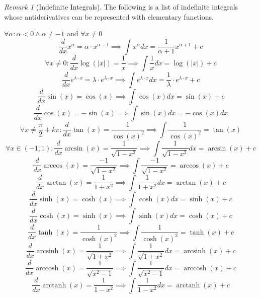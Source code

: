 \documentclass[english,titlepage]{uzhpub}
\DeclareMathOperator\arctanh{arctanh}
\DeclareMathOperator\arcsinh{arcsinh}
\DeclareMathOperator\arccosh{arccosh}
\theoremstyle{definition}
\theoremstyle{plain}
\theoremstyle{remark}
\newtheorem*{remark}{Remark}
\theoremstyle{example}
\begin{document}
   \begin{remark}[Indefinite Integrals]
      The following is a list of indefinite integrals whose antiderivatives can be represented with elementary functions.

      \(\forall \alpha: \alpha < 0 \land \alpha \neq -1\) and \(\forall x \neq 0\)
      \[\frac{d}{dx} x^\alpha = \alpha \cdot x^{\alpha - 1} \implies \int x^\alpha dx = \frac{1}{\alpha + 1} x^{\alpha + 1} + c\]
      \[\forall x \neq 0: \frac{d}{dx} \log(|x|) = \frac{1}{x} \implies \int \frac{1}{x} dx = \log(|x|) + c\]
      \[\frac{d}{dx} e^{\lambda \cdot x} = \lambda \cdot e^{\lambda \cdot x} \implies \int e^{\lambda \cdot x} dx = \frac{1}{\lambda} \cdot e^{\lambda \cdot x} + c\]
      \[\frac{d}{dx} \sin(x) = \cos(x) \implies \int \cos(x) dx = \sin(x) + c\]
      \[\frac{d}{dx} \cos(x) = -\sin(x) \implies \int \sin(x) dx = -\cos(x)dx\]
      \[\forall x \neq \frac{\pi}{2} + k\pi: \frac{d}{dx} \tan(x) = \frac{1}{\cos(x)^2} \implies \int \frac{1}{\cos(x)^2} = \tan(x)\]
      \[\forall x \in (-1;1): \frac{d}{dx} \arcsin(x) = \frac{1}{\sqrt{1 - x^2}} \implies \int \frac{1}{\sqrt{1 - x^2}}dx = \arcsin(x) + c\]
      \[\frac{d}{dx} \arccos(x) = \frac{-1}{\sqrt{1 - x^2}} \implies \int \frac{-1}{\sqrt{1 - x^2}} = \arccos(x) + c\]
      \[\frac{d}{dx} \arctan(x) = \frac{1}{1 + x^2} \implies \int \frac{1}{1 + x^2}dx = \arctan(x) + c\]
      \[\frac{d}{dx} \sinh(x) = \cosh(x) \implies \int \cosh(x)dx = \sinh(x) + c\]
      \[\frac{d}{dx} \cosh(x) = \sinh(x) \implies \int \sinh(x)dx = \cosh(x) + c\]
      \[\frac{d}{dx} \tanh(x) = \frac{1}{\cosh(x)^2} \implies \int \frac{1}{\cosh(x)^2} = \tanh(x) + c\]
      \[\frac{d}{dx} \arcsinh(x) = \frac{1}{\sqrt{1 + x^2}} \implies \int \frac{1}{\sqrt{1 + x^2}}dx = \arcsinh(x) + c\]
      \[\frac{d}{dx} \arccosh(x) = \frac{1}{\sqrt{x^2 - 1}} \implies \int \frac{1}{\sqrt{x^2 - 1}}dx = \arccosh(x) + c\]
      \[\frac{d}{dx} \arctanh(x) = \frac{1}{1- x^2} \implies \int \frac{1}{1-x^2}dx = \arctanh(x) + c\]
   \end{remark}
\end{document}
